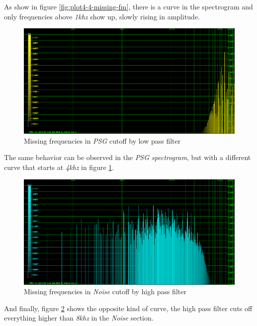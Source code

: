 \documentclass[10pt,a4paper]{report}
\begin{document}
As show in figure \ref{fig:plot4-4-missing-fm}, there is a curve in the spectrogram and only frequencies above \textit{1khz} show up, slowly rising in amplitude.

\begin{figure}[H]
	\centering
	\includegraphics[width=1.0\linewidth]{plots/Plot4-5-Missing-PSG}
	\caption[Missing PSG]{Missing frequencies in \textit{PSG} cutoff by low pass filter}
	\label{fig:plot4-5-missing-psg}
\end{figure}

The same behavior can be observed in the \textit{PSG spectrogram}, but with a different curve that starts at \textit{4khz} in figure \ref{fig:plot4-5-missing-psg}.

\begin{figure}[H]
	\centering
	\includegraphics[width=1.0\linewidth]{plots/Plot4-6-Missing-Noise}
	\caption[Missing Noise]{Missing frequencies in \textit{Noise} cutoff by high pass filter}
	\label{fig:plot4-6-missing-noise}
\end{figure}

And finally, figure \ref{fig:plot4-6-missing-noise} shows the opposite kind of curve, the high pass filter cuts off everything higher than \textit{8khz} in the \textit{Noise} section.
\end{document}
